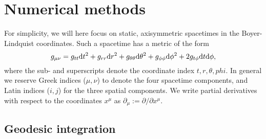 \section{Numerical methods}

For simplicity, we will here focus on static, axisymmetric spacetimes in the Boyer-Lindquist coordinates. Such a spacetime has a metric of the form 
\begin{equation}
\label{eq:static_axisymmetric_metric}
    g_{\mu\nu} 
    = g_{tt} \text{d} t^2 
    + g_{rr} \text{d} r^2 
    + g_{\theta\theta} \text{d} \theta^2 
    + g_{\phi\phi} \text{d} \phi^2 
    + 2g_{t\phi} \text{d} t \text{d} \phi, 
\end{equation}
where the sub- and superscripts denote the coordinate index $t, r, \theta, phi$. In general we reserve Greek indices ($\mu, \nu$) to denote the four spacetime components, and Latin indices ($i, j$) for the three spatial components. We write partial derivatives with respect to the coordinates $x^\mu$ as $\partial_\mu := \partial / \partial x^\mu$.


\subsection{Geodesic integration}

